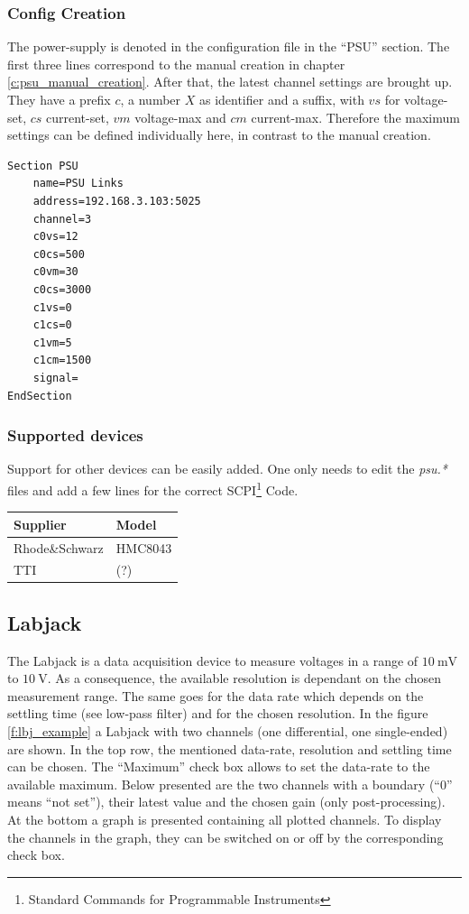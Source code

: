\documentclass[10pt,a4paper]{article}
\begin{document}
	\subsubsection{Config Creation}
	
	The power-supply is denoted in the configuration file in the \enquote{PSU} section. The first three lines correspond to the manual creation in chapter \ref{c:psu_manual_creation}. After that, the latest channel settings are brought up. They have a prefix $c$, a number $X$ as identifier and a suffix, with $vs$ for voltage-set, $cs$ current-set, $vm$ voltage-max and $cm$ current-max. Therefore the maximum settings can be defined individually here, in contrast to the manual creation.
	
\begin{lstlisting}[caption=PSU Config]
Section PSU
	name=PSU Links
	address=192.168.3.103:5025
	channel=3
	c0vs=12
	c0cs=500
	c0vm=30
	c0cs=3000
	c1vs=0
	c1cs=0
	c1vm=5
	c1cm=1500
	signal=
EndSection
\end{lstlisting}
	
		\subsubsection{Supported devices}
		Support for other devices can be easily added. One only needs to edit the \textit{psu.*} files and add a few lines for the correct SCPI\footnote{Standard Commands for Programmable Instruments} Code.
	
		\begin{table}[H]
		\centering
		\begin{tabular}{ll}
		\toprule
		Supplier			& Model \\ \midrule
		Rhode\&Schwarz		& HMC8043 \\
		TTI					& (?) \\
		\bottomrule
		\end{tabular}			
		\end{table}	
		
\newpage
	
	\subsection{Labjack}
	The Labjack is a data acquisition device to measure voltages in a range of $\SI{10}{\milli\volt}$ to $\SI{10}{\volt}$. As a consequence, the available resolution is dependant on the chosen measurement range. The same goes for the data rate which depends on the settling time (see low-pass filter) and for the chosen resolution. In the figure \eqref{f:lbj_example} a Labjack with two channels (one differential, one single-ended) are shown. In the top row, the mentioned data-rate, resolution and settling time can be chosen. The \enquote{Maximum} check box allows to set the data-rate to the available maximum. Below presented are the two channels with a boundary (\enquote{0} means \enquote{not set}), their latest value and the chosen gain (only post-processing). At the bottom a graph is presented containing all plotted channels. To display the channels in the graph, they can be switched on or off by the corresponding check box. 
	
\end{document}
